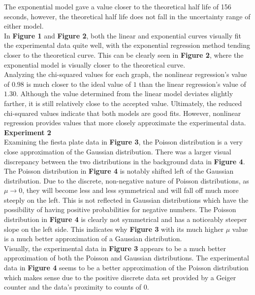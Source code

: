\documentclass[
	letterpaper, %
	10pt, %
]{CSUniSchoolLabReport}
\begin{document}
The exponential model gave a value closer to the theoretical half life of 156 seconds, however, the
theoretical half life does not fall in the uncertainty range of either model.\\
In \textbf{Figure 1} and \textbf{Figure 2}, both the linear and exponential curves visually fit the experimental data quite well,
with the exponential regression method tending closer to the theoretical curve. This can be clearly seen in \textbf{Figure 2}, where the exponential model is visually closer to the theoretical curve.\\
Analyzing the chi-squared values for each graph, the nonlinear regression's value of $0.98$ is much closer to
the ideal value of $1$ than the linear regression's value of $1.30$. Although the value determined from the linear
model deviates slightly farther, it is still relatively close to the accepted value. Ultimately, the reduced chi-squared
values indicate that both models are good fits. However, nonlinear regression provides values that more closely approximate the experimental data.\\

{\Large\textbf{Experiment 2}}\\

Examining the fiesta plate data in \textbf{Figure 3}, the Poisson distribution is a very close approximation of the
Gaussian distribution. There was a larger visual discrepancy between the two distributions in the background
data in \textbf{Figure 4}. The Poisson distribution in \textbf{Figure 4} is notably shifted left of the Gaussian
distribution. Due to the discrete, non-negative nature of Poisson distributions, as $\mu\rightarrow 0$, they will become less and less
symmetrical and will fall off much more steeply on the left. This is not reflected in Gaussian
distributions which have the possibility of having positive probabilities for negative numbers. The Poisson
distribution in \textbf{Figure 4} is clearly not symmetrical and has a noticeably steeper slope on the left side. This
indicates why \textbf{Figure 3} with its much higher $\mu$ value is a much better approximation of a Gaussian distribution.\\

Visually, the experimental data in \textbf{Figure 3} appears to be a much better approximation of both the Poisson
and Gaussian distributions. The experimental data in \textbf{Figure 4} seems to be a better approximation of the
Poisson distribution which makes sense due to the positive discrete data set provided by a Geiger counter
and the data's proximity to counts of $0$.
\newpage
\vspace{20pt}
\end{document}
